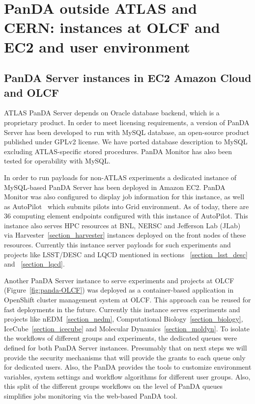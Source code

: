 \documentclass{webofc}
\begin{document}
\section{PanDA outside ATLAS and CERN: instances at OLCF and EC2 and user environment}

\subsection{PanDA Server instances in EC2 Amazon Cloud and OLCF}


ATLAS PanDA Server depends on Oracle database backend, which is a proprietary product. In order to meet licensing requirements, a version of PanDA Server has been developed to run with MySQL database, an open-source product published under GPLv2 license.  
We have ported database description to MySQL excluding ATLAS-specific stored procedures. PanDA Monitor has also been tested for operability with MySQL.

In order to run payloads for non-ATLAS experiments a dedicated instance of MySQL-based PanDA Server has been deployed in Amazon EC2.  
PanDA Monitor was also configured to display job information for this instance, as well as AutoPilot~\cite{PanDAPilotSubmission} which submits pilots into Grid environment. 
As of today, there are 36 computing element endpoints configured with this instance of AutoPilot. 
This instance also serves HPC resources at BNL, NERSC and Jefferson Lab (JLab) via Harvester~\ref{section_harvester} instances deployed on the front nodes of these resources. 
Currently this instance server payloads for such experiments and projects like LSST/DESC and LQCD mentioned in sections ~\ref{section_lsst_desc} and ~\ref{section_lqcd}.

Another  PanDA Server instance to serve experiments and projects at OLCF (Figure~\ref{fig:panda-OLCF}) was deployed as a container-based application in OpenShift cluster management system at OLCF. This approach can be reused for fast deployments in the future. Currently this instance serves experiments and projects like nEDM~\ref{section_nedm}, Computational Biology~\ref{section_biology}, IceCube~\ref{section_icecube} and Molecular Dynamics~\ref{section_moldyn}.
To isolate the workflows of different groups and experiments, the dedicated queues were defined for both PanDA Server instances. 
Presumably that on next steps we will provide the security mechanisms that will provide the grants to each queue only for dedicated users. 
Also, the PanDA provides the tools to customize environment variables, system settings and workflow algorithms for different user groups. 
Also, this split of the different groups workflows on the level of PanDA queues simplifies jobs monitoring via the web-based PanDA tool. 
\end{document}
